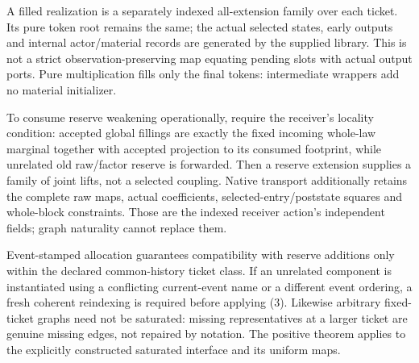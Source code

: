 \documentclass[11pt]{article}
\begin{document}
A filled realization is a separately indexed all-extension family over each ticket. Its pure token root remains the same; the actual selected states, early outputs and internal actor/material records are generated by the supplied library. This is not a strict observation-preserving map equating pending slots with actual output ports. Pure multiplication fills only the final tokens: intermediate wrappers add no material initializer.

To consume reserve weakening operationally, require the receiver's locality condition: accepted global fillings are exactly the fixed incoming whole-law marginal together with accepted projection to its consumed footprint, while unrelated old raw/factor reserve is forwarded. Then a reserve extension supplies a family of joint lifts, not a selected coupling. Native transport additionally retains the complete raw maps, actual coefficients, selected-entry/poststate squares and whole-block constraints. Those are the indexed receiver action's independent fields; graph naturality cannot replace them.

Event-stamped allocation guarantees compatibility with reserve additions only within the declared common-history ticket class. If an unrelated component is instantiated using a conflicting current-event name or a different event ordering, a fresh coherent reindexing is required before applying (3). Likewise arbitrary fixed-ticket graphs need not be saturated: missing representatives at a larger ticket are genuine missing edges, not repaired by notation. The positive theorem applies to the explicitly constructed saturated interface and its uniform maps.
\end{document}
